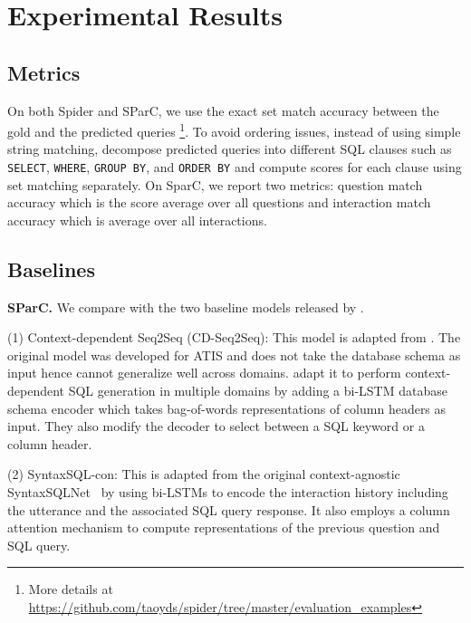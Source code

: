 \documentclass[11pt,a4paper]{article}
\begin{document}
\section{Experimental Results}
\vspace{-1mm}
\subsection{Metrics}
\vspace{-1mm}
On both Spider and SParC, we use the exact set match accuracy between the gold and the predicted queries \footnote{More details at \scriptsize \url{https://github.com/taoyds/spider/tree/master/evaluation_examples}}.
To avoid ordering issues, instead of using simple string matching,  decompose predicted queries into different SQL clauses such as \texttt{SELECT}, \texttt{WHERE}, \texttt{GROUP BY}, and \texttt{ORDER BY} and compute scores for each clause using set matching separately.
On SparC, we report two metrics: question match accuracy which is the score average over all questions and interaction match accuracy which is average over all interactions.

\vspace{-1mm}
\subsection{Baselines}
\vspace{-1mm}

\textbf{SParC.}
We compare with the two baseline models released by .

(1) Context-dependent Seq2Seq (CD-Seq2Seq): This model is adapted from . The original model was developed for ATIS and does not take the database schema as input hence cannot generalize well across domains.  adapt it to perform context-dependent SQL generation in multiple domains by adding a bi-LSTM database schema encoder which takes bag-of-words representations of column headers as input. They also modify the decoder to select between a SQL keyword or a column header.

(2) SyntaxSQL-con: This is adapted from the original context-agnostic SyntaxSQLNet~\cite{yu2018syntaxsqlnet} by using bi-LSTMs to encode the interaction history including the utterance and the associated SQL query response.
It also employs a column attention mechanism to compute representations of the previous question and SQL query.
\end{document}
